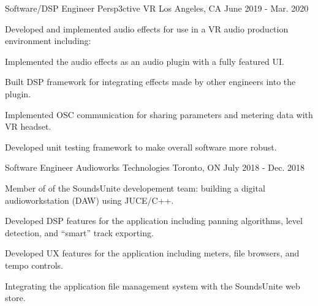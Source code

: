\begin{cventries}
  \cventry
    {Software/DSP Engineer} %
    {Persp3ctive VR} %
    {Los Angeles, CA} %
    {June 2019 - Mar. 2020} %
    {
      \begin{cvitems} %
        \item {Developed and implemented audio effects for use in a VR audio production environment including:}
        \item {Implemented the audio effects as an audio plugin with a fully featured UI.}
        \item {Built DSP framework for integrating effects made by other engineers into the plugin.}
        \item {Implemented OSC communication for sharing parameters and metering data with VR headset.}
        \item {Developed unit testing framework to make overall software more robust.}
      \end{cvitems}
    }

  \cventry
    {Software Engineer} %
    {Audioworks Technologies} %
    {Toronto, ON} %
    {July 2018 - Dec. 2018} %
    {
      \begin{cvitems} %
        \item {Member of of the SoundsUnite developement team: building a digital audioworkstation (DAW) using JUCE/C++.}
        \item {Developed DSP features for the application including panning algorithms, level detection, and ``smart'' track exporting.}
        \item {Developed UX features for the application including meters, file browsers, and tempo controls.}
        \item {Integrating the application file management system with the SoundsUnite web store.}
      \end{cvitems}
    }


\end{cventries}
